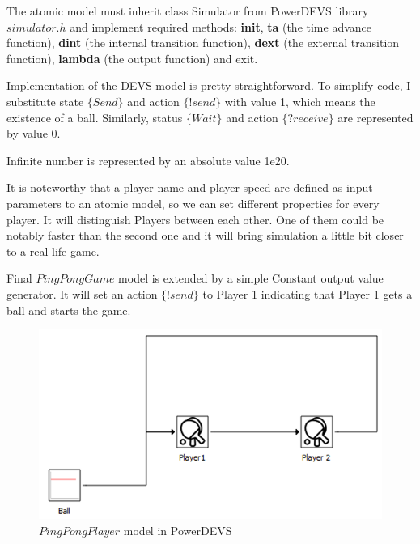 \documentclass[fleqn,10pt]{olplainarticle}
\begin{document}
\vskip10pt

The atomic model must inherit class Simulator from PowerDEVS library $simulator.h$ and implement required methods: \textbf{init}, \textbf{ta} (the time advance function), \textbf{dint} (the internal transition function), \textbf{dext} (the external transition function), \textbf{lambda} (the output function) and exit.

\vskip10pt

Implementation of the DEVS model is pretty straightforward. To simplify code, I substitute state $\{Send\}$ and action $\{!send\}$ with value 1, which means the existence of a ball. Similarly, status $\{Wait\}$ and action $\{?receive\}$ are represented by value 0.

\vskip10pt

Infinite number is represented by an absolute value 1e20.

\vskip10pt

It is noteworthy that a player name and player speed are defined as input parameters to an atomic model, so we can set different properties for every player. It will distinguish Players between each other. One of them could be notably faster than the second one and it will bring simulation a little bit closer to a real-life game.

\vskip10pt





\pagebreak



\pagebreak

\noindent Final $PingPongGame$ model is extended by a simple Constant output value generator. It will set an action $\{!send\}$  to Player 1 indicating that Player 1 gets a ball and starts the game.

\begin{figure}[ht]
    \centering
    \includegraphics[width=0.8\linewidth]{images/6-ping-pong-devs.png}
    \caption{$PingPongPlayer$ model in PowerDEVS}
    \label{fig:figure4}
\end{figure}
\end{document}
